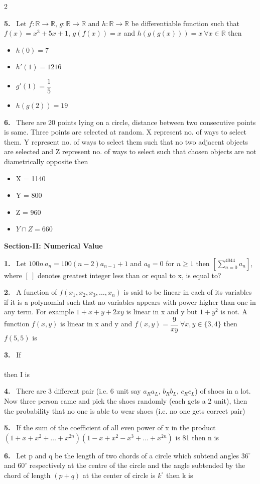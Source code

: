 \documentclass[10pt]{extarticle}
\newcommand{\sect}[1]{\par\smallskip\noindent\textbf{#1}\par}
\newcommand{\qn}[1]{\par\smallskip\noindent\textbf{#1.}~}
\newenvironment{qoptions}{\begin{itemize}[leftmargin=1.8em,itemsep=1pt,topsep=2pt,label={}]}{\end{itemize}}
\newcommand{\opt}[2]{\item[(#1)] #2}
\begin{document}
\begin{multicols}{2}
\qn{5} Let $f:\mathbb{R}\to\mathbb{R}$, $g:\mathbb{R}\to\mathbb{R}$ and $h:\mathbb{R}\to\mathbb{R}$ be differentiable function such that $f(x) = x^3+5x+1$, $g(f(x)) = x$ and $h(g(g(x))) = x\ \forall x\in\mathbb{R}$ then
\begin{qoptions}
\opt{A}{$h(0) = 7$}
\opt{B}{$h'(1) = 1216$}
\opt{C}{$g'(1) = \dfrac15$}
\opt{D}{$h(g(2)) = 19$}
\end{qoptions}

\qn{6} There are 20 points lying on a circle, distance between two consecutive points is same. Three points are selected at random. X represent no. of ways to select them. Y represent no. of ways to select them such that no two adjacent objects are selected and Z represent no. of ways to select such that chosen objects are not diametrically opposite then
\begin{qoptions}
\opt{A}{X = 1140}
\opt{B}{Y = 800}
\opt{C}{Z = 960}
\opt{D}{$Y\cap Z = 660$}
\end{qoptions}

\sect{Section-II: Numerical Value}

\qn{1} Let $100n\,a_n = 100(n-2)a_{n-1} + 1$ and $a_0 = 0$ for $n\ge1$ then $\left[\displaystyle\sum_{n=0}^{4044} a_n\right]$, where $[\ ]$ denotes greatest integer less than or equal to x, is equal to?

\qn{2} A function of $f(x_1,x_2,x_3,\ldots,x_n)$ is said to be linear in each of its variables if it is a polynomial such that no variables appears with power higher than one in any term. For example $1+x+y+2xy$ is linear in x and y but $1+y^2$ is not. A function $f(x,y)$ is linear in x and y and $f(x,y) = \dfrac{9}{xy}\ \forall x,y\in\{3,4\}$ then $f(5,5)$ is

\qn{3} If\\
\\
then I is

\qn{4} There are 3 different pair (i.e. 6 unit say $a_Ra_L$, $b_Rb_L$, $c_Rc_L$) of shoes in a lot. Now three person came and pick the shoes randomly (each gets a 2 unit), then the probability that no one is able to wear shoes (i.e. no one gets correct pair)

\qn{5} If the sum of the coefficient of all even power of x in the product $(1+x+x^2+\ldots+x^{2n})(1-x+x^2-x^3+\ldots+x^{2n})$ is 81 then n is

\qn{6} Let p and q be the length of two chords of a circle which subtend angles $36^\circ$ and $60^\circ$ respectively at the centre of the circle and the angle subtended by the chord of length $(p+q)$ at the center of circle is $k^\circ$ then k is


\end{multicols}
\end{document}
